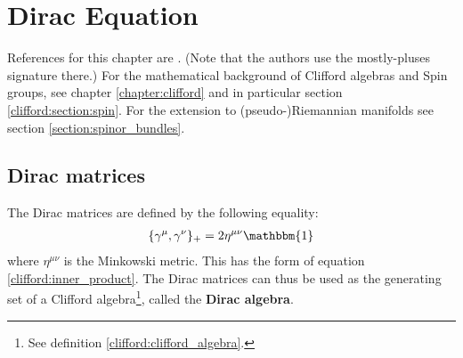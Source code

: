 \chapter{Dirac Equation}\label{chapter:dirac}

    References for this chapter are \cite{supergravity}. (Note that the authors use the mostly-pluses signature there.) For the mathematical background of Clifford algebras and Spin groups, see chapter \ref{chapter:clifford} and in particular section \ref{clifford:section:spin}. For the extension to (pseudo-)Riemannian manifolds see section \ref{section:spinor_bundles}.

\section{Dirac matrices}

    \begin{property}
        The Dirac matrices are defined by the following equality:
        \begin{gather}
            \label{dirac:clifford_relation}
            \{\gamma^\mu,\gamma^\nu\}_+ = 2\eta^{\mu\nu}\mathbbm{1}
        \end{gather}
        where $\eta^{\mu\nu}$ is the Minkowski metric. This has the form of equation \ref{clifford:inner_product}. The Dirac matrices can thus be used as the generating set of a Clifford algebra\footnote{See definition \ref{clifford:clifford_algebra}.}, called the \textbf{Dirac algebra}.
    \end{property}

